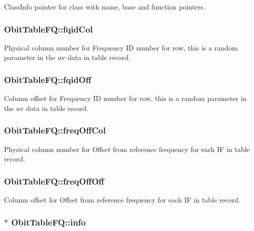 Class\-Info pointer for class with name, base and function pointers. 

\subsubsection{ {\bf Obit\-Table\-FQ::fqid\-Col}}\label{structObitTableFQ_o17}


Physical column number for Frequency ID number for row, this is a random parameter in the uv data in table record. 

\subsubsection{ {\bf Obit\-Table\-FQ::fqid\-Off}}\label{structObitTableFQ_o16}


Column offset for Frequency ID number for row, this is a random parameter in the uv data in table record. 

\subsubsection{ {\bf Obit\-Table\-FQ::freq\-Off\-Col}}\label{structObitTableFQ_o19}


Physical column number for Offset from reference frequency for each IF in table record. 

\subsubsection{ {\bf Obit\-Table\-FQ::freq\-Off\-Off}}\label{structObitTableFQ_o18}


Column offset for Offset from reference frequency for each IF in table record. 

\subsubsection{$\ast$ {\bf Obit\-Table\-FQ::info}}\label{structObitTableFQ_o5}


